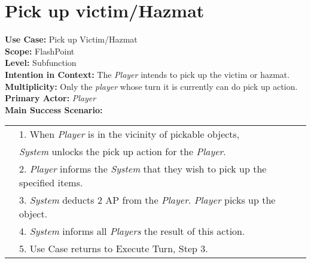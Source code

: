 \documentclass{article}
\begin{document}
	\section*{Pick up victim/Hazmat}
	\textbf{Use Case:} Pick up Victim/Hazmat\\
	\textbf{Scope:} FlashPoint\\
	\textbf{Level:} Subfunction\\
	\textbf{Intention in Context:} The \textit{Player} intends to pick up the victim or hazmat.\\
	\textbf{Multiplicity:} Only the \textit{player} whose turn it is currently can do pick up action.\\
	\textbf{Primary Actor:} \textit{Player}\\
	\textbf{Main Success Scenario:}\\
	\begin{tabular}{l l}
		&1. When \textit{Player} is in the vicinity of pickable objects,\\
		&\qquad\textit{System} unlocks the pick up action for the \textit{Player}.\\
		&2. \textit{Player} informs the \textit{System} that they wish to pick up the specified items.\\
		&3. \textit{System} deducts 2 AP from the \textit{Player}. \textit{Player} picks up the object.\\
		&4. \textit{System} informs all \textit{Players} the result of this action.\\
		&5. Use Case returns to Execute Turn, Step 3.
	\end{tabular}
\end{document}
